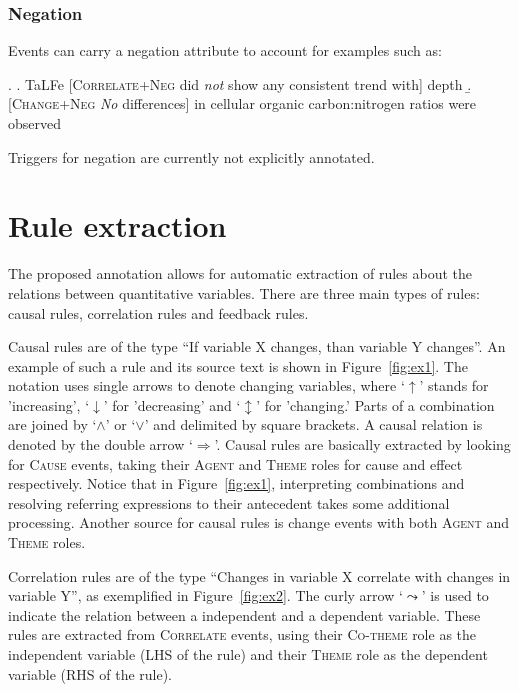 \documentclass[10pt, a4paper]{article}
\newcommand{\tag}[1]{\textsc{#1}}
\begin{document}
\subsubsection{Negation}

Events can carry a negation attribute to account for examples such as:

\exi.
  \a. TaLFe [\tag{Correlate+Neg} did \emph{not} show any consistent trend with] depth 
  \b. [\tag{Change+Neg} \emph{No} differences] in cellular organic carbon:nitrogen ratios were observed

Triggers for negation are currently not explicitly annotated.


\section{Rule extraction}
\label{sec:extraction}

The proposed annotation allows for automatic extraction of rules about the relations between quantitative variables.
There are three main types of rules: causal rules, correlation rules and feedback rules.

Causal rules are of the type ``If variable X changes, than variable Y changes''.
An example of such a rule and its source text is shown in Figure~\ref{fig:ex1}.
The notation uses single arrows to denote changing variables, where `$\uparrow$' stands for 'increasing', `$\downarrow$' for 'decreasing' and `$\updownarrow$' for 'changing.'
Parts of a combination are joined by `$\wedge$' or `$\vee$' and delimited by square brackets.
A causal relation is denoted by the double arrow `$\Longrightarrow$'.
Causal rules are basically extracted by looking for \tag{Cause} events, taking their \tag{Agent} and \tag{Theme} roles for cause and effect respectively.
Notice that in Figure~\ref{fig:ex1}, interpreting combinations and resolving referring expressions to their antecedent takes some additional processing.
Another source for causal rules is change events with both \tag{Agent} and \tag{Theme} roles.

Correlation rules are of the type ``Changes in variable X correlate with changes in variable Y'', as exemplified in Figure~\ref{fig:ex2}.
The curly arrow `$\leadsto$' is used to indicate the relation between a independent and a dependent variable.
These rules are extracted from \tag{Correlate} events, using their \tag{Co-theme} role as the independent variable (LHS of the rule) and their \tag{Theme} role as the dependent variable (RHS of the rule). 
\end{document}
